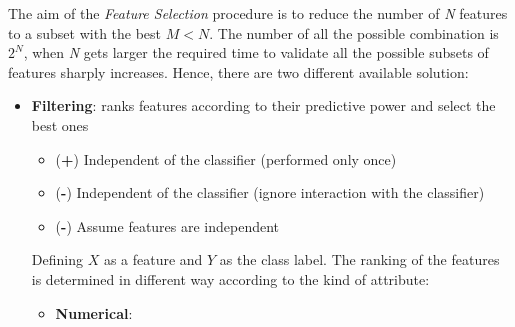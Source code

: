 The aim of the \emph{Feature Selection} procedure is to reduce the number of \emph{N} features to a subset with the best $M < N$. The number of all the possible combination is $2^N$, when \emph{N} gets larger the required time to validate all the possible subsets of features sharply increases. Hence, there are two different available solution:
\begin{itemize}
\item \textbf{Filtering}: ranks features according to their predictive power and select the best ones
\begin{itemize}
\item (\textbf{+}) Independent of the classifier (performed only once)
\item (\textbf{-}) Independent of the classifier (ignore interaction with the classifier)
\item (\textbf{-}) Assume features are independent
\end{itemize}

Defining $X$ as a feature and $Y$ as the class label. The ranking of the features is determined in different way according to the kind of attribute:
\begin{itemize}
\item \textbf{Numerical}:


\end{itemize}
\end{itemize}
